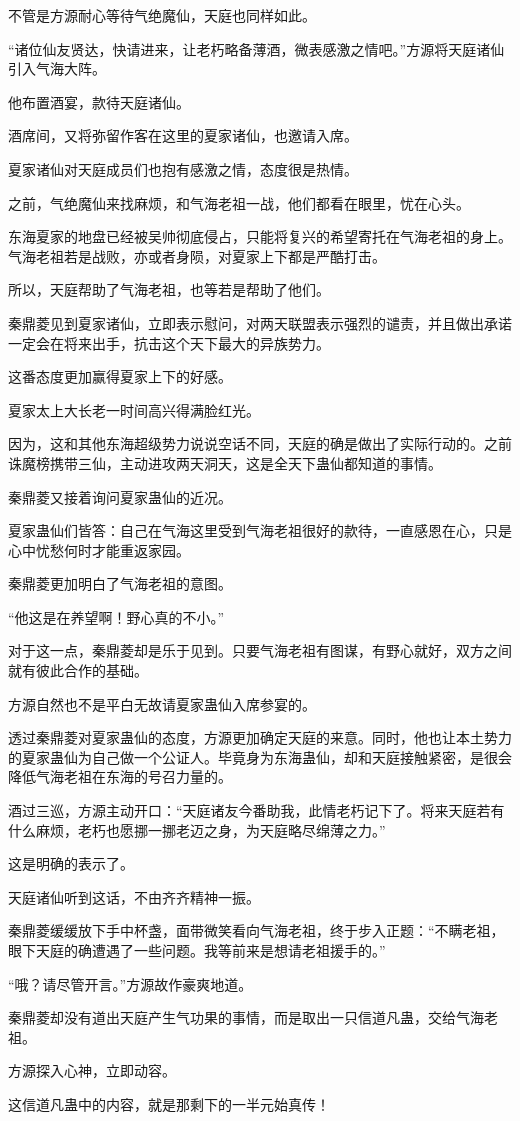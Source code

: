 \begin{this_body}
不管是方源耐心等待气绝魔仙，天庭也同样如此。

“诸位仙友贤达，快请进来，让老朽略备薄酒，微表感激之情吧。”方源将天庭诸仙引入气海大阵。

他布置酒宴，款待天庭诸仙。

酒席间，又将弥留作客在这里的夏家诸仙，也邀请入席。

夏家诸仙对天庭成员们也抱有感激之情，态度很是热情。

之前，气绝魔仙来找麻烦，和气海老祖一战，他们都看在眼里，忧在心头。

东海夏家的地盘已经被吴帅彻底侵占，只能将复兴的希望寄托在气海老祖的身上。气海老祖若是战败，亦或者身陨，对夏家上下都是严酷打击。

所以，天庭帮助了气海老祖，也等若是帮助了他们。

秦鼎菱见到夏家诸仙，立即表示慰问，对两天联盟表示强烈的谴责，并且做出承诺一定会在将来出手，抗击这个天下最大的异族势力。

这番态度更加赢得夏家上下的好感。

夏家太上大长老一时间高兴得满脸红光。

因为，这和其他东海超级势力说说空话不同，天庭的确是做出了实际行动的。之前诛魔榜携带三仙，主动进攻两天洞天，这是全天下蛊仙都知道的事情。

秦鼎菱又接着询问夏家蛊仙的近况。

夏家蛊仙们皆答：自己在气海这里受到气海老祖很好的款待，一直感恩在心，只是心中忧愁何时才能重返家园。

秦鼎菱更加明白了气海老祖的意图。

“他这是在养望啊！野心真的不小。”

对于这一点，秦鼎菱却是乐于见到。只要气海老祖有图谋，有野心就好，双方之间就有彼此合作的基础。

方源自然也不是平白无故请夏家蛊仙入席参宴的。

透过秦鼎菱对夏家蛊仙的态度，方源更加确定天庭的来意。同时，他也让本土势力的夏家蛊仙为自己做一个公证人。毕竟身为东海蛊仙，却和天庭接触紧密，是很会降低气海老祖在东海的号召力量的。

酒过三巡，方源主动开口：“天庭诸友今番助我，此情老朽记下了。将来天庭若有什么麻烦，老朽也愿挪一挪老迈之身，为天庭略尽绵薄之力。”

这是明确的表示了。

天庭诸仙听到这话，不由齐齐精神一振。

秦鼎菱缓缓放下手中杯盏，面带微笑看向气海老祖，终于步入正题：“不瞒老祖，眼下天庭的确遭遇了一些问题。我等前来是想请老祖援手的。”

“哦？请尽管开言。”方源故作豪爽地道。

秦鼎菱却没有道出天庭产生气功果的事情，而是取出一只信道凡蛊，交给气海老祖。

方源探入心神，立即动容。

这信道凡蛊中的内容，就是那剩下的一半元始真传！

\end{this_body}

